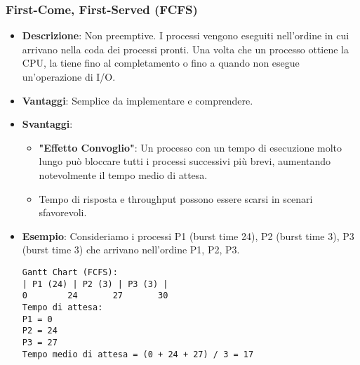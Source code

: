 \subsubsection{First-Come, First-Served (FCFS)}
\begin{itemize}
    \item \textbf{Descrizione}: Non preemptive. I processi vengono eseguiti nell'ordine in cui arrivano nella coda dei processi pronti. Una volta che un processo ottiene la CPU, la tiene fino al completamento o fino a quando non esegue un'operazione di I/O.
    \item \textbf{Vantaggi}: Semplice da implementare e comprendere.
    \item \textbf{Svantaggi}:
    \begin{itemize}
        \item \textbf{"Effetto Convoglio"}: Un processo con un tempo di esecuzione molto lungo può bloccare tutti i processi successivi più brevi, aumentando notevolmente il tempo medio di attesa.
        \item Tempo di risposta e throughput possono essere scarsi in scenari sfavorevoli.
    \end{itemize}
    \item \textbf{Esempio}: Consideriamo i processi P1 (burst time 24), P2 (burst time 3), P3 (burst time 3) che arrivano nell'ordine P1, P2, P3.
    \begin{lstlisting}[numbers=none, language=Pseudocode]
Gantt Chart (FCFS):
| P1 (24) | P2 (3) | P3 (3) |
0        24       27       30
Tempo di attesa:
P1 = 0
P2 = 24
P3 = 27
Tempo medio di attesa = (0 + 24 + 27) / 3 = 17
    \end{lstlisting}
\end{itemize}

